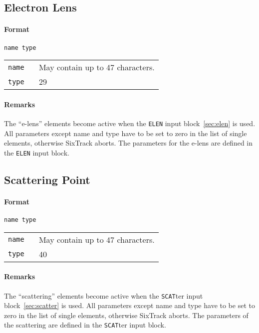 \subsection{Electron Lens} \label{ELEN}

\paragraph{Format} \texttt{name type}

\bigskip
\begin{tabular}{@{}lp{0.8\linewidth}}
    \texttt{name} & May contain up to 47 characters. \\
    \texttt{type} & 29
\end{tabular}

\paragraph{Remarks}
The ``e-lens'' elements become active when the \texttt{ELEN} input block~\ref{sec:elen} is used.
All parameters except name and type have to be set to zero in the list of single elements, otherwise SixTrack aborts.
The parameters for the e-lens are defined in the \texttt{ELEN} input block.

\subsection{Scattering Point} \label{SCAT}

\paragraph{Format} \texttt{name type}

\bigskip
\begin{tabular}{@{}lp{0.8\linewidth}}
    \texttt{name} & May contain up to 47 characters. \\
    \texttt{type} & 40
\end{tabular}

\paragraph{Remarks}
The ``scattering'' elements become active when the \texttt{SCAT}ter input block~\ref{sec:scatter} is used.
All parameters except name and type have to be set to zero in the list of single elements, otherwise SixTrack aborts.
The parameters of the scattering are defined in the \texttt{SCAT}ter input block.

